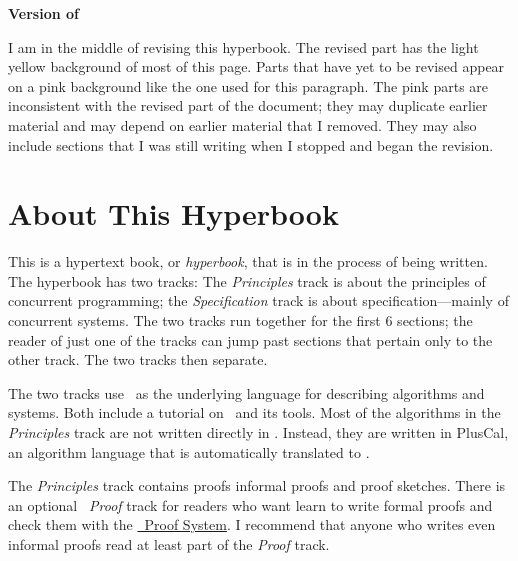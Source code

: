 \documentclass[fleqn,leqno]{article}
\begin{document}

\begin{center}
\large \bf Version of \dayMonthYear
\end{center}


\bigskip

 \noindent {}%
%
\colorbox{rose}{
\begin{minipage}{\textwidth} 
I am in the middle of revising this hyperbook. 
The revised part has the light yellow
background of most of this page.  Parts that have yet to be revised
appear on a pink background like the one used for this paragraph.  The
pink parts are inconsistent with the revised part of the document;
they may duplicate earlier material and may depend on earlier material
that I removed.  They may also include sections that I was
still writing when I stopped and began the revision.
\end{minipage}}


\section*{About This Hyperbook}

This is a hypertext book, or \emph{hyperbook}, that is in the process
of being written.  The hyperbook has two tracks: The \emph{Principles}
track is about the principles of concurrent programming; the
\emph{Specification} track is about specification---mainly of
concurrent systems.  The two tracks run together for the first 6
sections; the reader of just one of the tracks can jump past sections
that pertain only to the other track.  The two tracks then separate.

The two tracks use \tlaplus\ as the underlying language for describing
algorithms and systems.  Both include a tutorial on \tlaplus\ and its
tools.  Most of the algorithms in the \emph{Principles} track are not
written directly in \tlaplus.  Instead, they are written in PlusCal,
an algorithm language that is automatically translated to \tlaplus.

The \emph{Principles} track contains proofs informal proofs and proof
sketches.  There is an optional \emph{\tlaplus\ Proof} track for
readers who want learn to write formal proofs and check them with the
\hyperref{http://tla.msr-inria.inria.fr/tlaps/content/Home.html}{}{}{\protect\tlaplus\
Proof System}.  
I recommend that anyone who writes even informal proofs
read at least part of the \emph{Proof} track.
\end{document}
